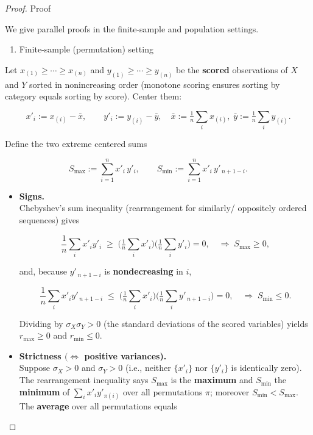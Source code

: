 \documentclass[
  letterpaper,
  DIV=11,
  numbers=noendperiod]{scrartcl}
\providecommand{\tightlist}{%
  \setlength{\itemsep}{0pt}\setlength{\parskip}{0pt}}
\theoremstyle{remark}
\begin{document}
\begin{proof}
Proof

We give parallel proofs in the finite-sample and population settings.

\begin{enumerate}
\def\labelenumi{\Alph{enumi})}
\tightlist
\item
  Finite-sample (permutation) setting
\end{enumerate}

Let \(x_{(1)}\ge\cdots\ge x_{(n)}\) and \(y_{(1)}\ge\cdots\ge y_{(n)}\)
be the \textbf{scored} observations of \(X\) and \(Y\) sorted in
nonincreasing order (monotone scoring ensures sorting by category equals
sorting by score). Center them:

\[x'_i := x_{(i)}-\bar x,\qquad y'_i := y_{(i)}-\bar y,\quad  
\bar x := \tfrac1n\sum_i x_{(i)},\;\bar y := \tfrac1n\sum_i y_{(i)}.\]

Define the two extreme centered sums

\[S_{\max} := \sum_{i=1}^n x'_i\,y'_i,\qquad  
S_{\min} := \sum_{i=1}^n x'_i\,y'_{\,n+1-i}.\]

\begin{itemize}
\item
  \textbf{Signs.}\\
  Chebyshev's sum inequality (rearrangement for similarly/ oppositely
  ordered sequences) gives

  \[\frac1n\sum_i x'_i y'_i \;\ge\; \Big(\tfrac1n\sum_i x'_i\Big)\Big(\tfrac1n\sum_i y'_i\Big)=0,  
    \quad\Rightarrow\; S_{\max}\ge 0,\]

  and, because \(y'_{\,n+1-i}\) is \textbf{nondecreasing} in \(i\),

  \[\frac1n\sum_i x'_i y'_{\,n+1-i} \;\le\; \Big(\tfrac1n\sum_i x'_i\Big)\Big(\tfrac1n\sum_i y'_{\,n+1-i}\Big)=0,  
    \quad\Rightarrow\; S_{\min}\le 0.\]

  Dividing by \(\sigma_X\sigma_Y>0\) (the standard deviations of the
  scored variables) yields \(r_{\max}\ge 0\) and \(r_{\min}\le 0\).
\item
  \textbf{Strictness \((\Leftrightarrow\) positive variances).}\\
  Suppose \(\sigma_X>0\) and \(\sigma_Y>0\) (i.e., neither \(\{x'_i\}\)
  nor \(\{y'_i\}\) is identically zero). The rearrangement inequality
  says \(S_{\max}\) is the \textbf{maximum} and \(S_{\min}\) the
  \textbf{minimum} of \(\sum_i x'_i y'_{\pi(i)}\) over all permutations
  \(\pi\); moreover \(S_{\min}<S_{\max}\). The \textbf{average} over all
  permutations equals


\end{itemize}
\end{proof}
\end{document}
